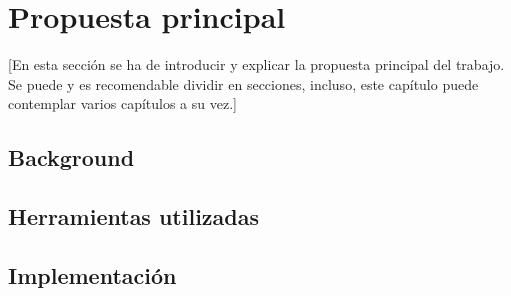 \chapter{Propuesta principal}\label{cap:propuesta}

[En esta sección se ha de introducir y explicar la propuesta principal del trabajo. Se puede y es recomendable dividir en secciones, incluso, este capítulo puede contemplar varios  capítulos a su vez.]

\section{Background}

\section{Herramientas utilizadas}

\section{Implementación}